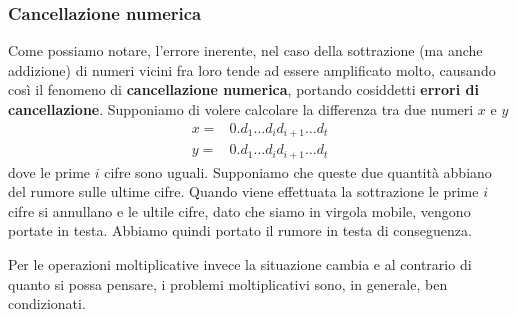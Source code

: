 \subsubsection{Cancellazione numerica}
Come possiamo notare, l'errore inerente, nel caso della sottrazione (ma anche addizione) di numeri vicini fra
loro tende ad essere amplificato molto, causando così il fenomeno di \textbf{cancellazione numerica}, portando
cosiddetti \textbf{errori di cancellazione}. Supponiamo di volere calcolare la differenza tra due numeri $x$
e $y$
\begin{align*}
	x = & 0. d_1 \dots d_i d_{i+1} \dots d_t \\
	y = & 0. d_1 \dots d_i d_{i+1} \dots d_t
\end{align*}
dove le prime $i$ cifre sono uguali. Supponiamo che queste due quantità abbiano del rumore sulle ultime cifre.
Quando viene effettuata la sottrazione le prime $i$ cifre si annullano e le ultile cifre, dato che siamo in
virgola mobile, vengono portate in testa. Abbiamo quindi portato il rumore in testa di conseguenza.

Per le operazioni moltiplicative invece la situazione cambia e al contrario di quanto si possa pensare, i problemi
moltiplicativi sono, in generale, ben condizionati.

